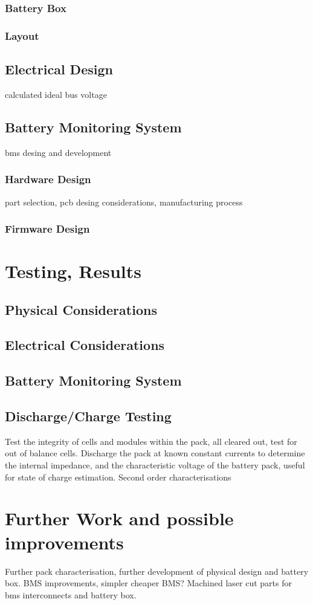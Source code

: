 \subsubsection{Battery Box}
\subsubsection{Layout}


\subsection{Electrical Design}
calculated ideal bus voltage
\subsection{Battery Monitoring System}
bms desing and development
\subsubsection{Hardware Design}
part selection, pcb desing considerations, manufacturing process
\subsubsection{Firmware Design}


\section{Testing, Results}
\subsection{Physical Considerations}
\subsection{Electrical Considerations}
\subsection{Battery Monitoring System}
\subsection{Discharge/Charge Testing}
Test the integrity of cells and modules within the pack, all cleared out, test for out of balance cells.
Discharge the pack at known constant currents to determine the internal impedance, and the characteristic voltage of the battery pack, useful for state of charge estimation.
Second order characterisations

\section{Further Work and possible improvements}
Further pack characterisation, further development of physical design and battery box. BMS improvements, simpler cheaper BMS? Machined laser cut parts for bms interconnects and battery box. 

